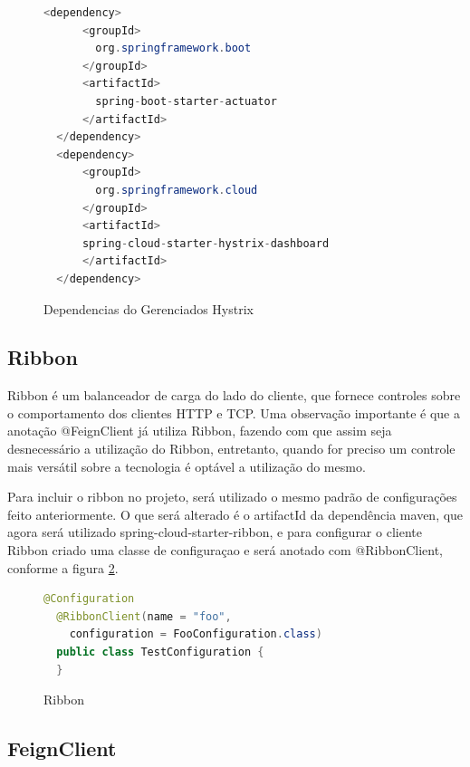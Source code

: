 \documentclass[journal]{IEEEtran}
\begin{document}
\begin{figure}[h]
\centering

\begin{lstlisting}[language=Java]
  <dependency>
      <groupId>
        org.springframework.boot
      </groupId>
      <artifactId>
        spring-boot-starter-actuator
      </artifactId>
  </dependency>
  <dependency>
      <groupId>
        org.springframework.cloud
      </groupId>
      <artifactId>
      spring-cloud-starter-hystrix-dashboard
      </artifactId>
  </dependency>
\end{lstlisting}

\caption{Dependencias do Gerenciados Hystrix}
\label{alg:figuraonze}
\end{figure}

\subsection{Ribbon}

Ribbon é um  balanceador de carga do lado do cliente, que fornece controles sobre o comportamento dos clientes HTTP e TCP. Uma observação importante é que a anotação @FeignClient já utiliza Ribbon, fazendo com que assim seja desnecessário a utilização do Ribbon, entretanto, quando for preciso um controle mais versátil sobre a tecnologia é optável a utilização do mesmo.

Para incluir o ribbon no projeto, será utilizado o mesmo padrão de configurações feito anteriormente. O que será alterado é o artifactId da dependência maven, que agora será utilizado spring-cloud-starter-ribbon, e para configurar o cliente Ribbon criado uma classe de configuraçao e será anotado com @RibbonClient, conforme a figura \ref{alg:figuradoze}.

\begin{figure}[h]
\centering

\begin{lstlisting}[language=Java]
  @Configuration
  @RibbonClient(name = "foo", 
    configuration = FooConfiguration.class)
  public class TestConfiguration {
  }
\end{lstlisting}

\caption{Ribbon}
\label{alg:figuradoze}
\end{figure}

\subsection{FeignClient}
\end{document}
